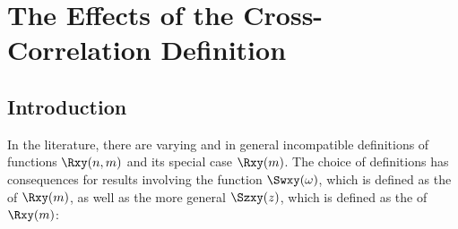 \chapter{The Effects of the Cross-Correlation Definition}
\label{app:xcordef}
\section{Introduction}
In the literature, there are varying and in general incompatible definitions of
 functions $\Rxy(n,m)$ and its  special case $\Rxy(m)$. %
The choice of definitions has consequences for results involving the  function
$\Swxy(\omega)$, %
which is defined as the  of $\Rxy(m)$,
as well as the more general $\Szxy(z)$,
which is defined as the  of $\Rxy(m)$:
\begin{definition}\label{def:Swxy}\label{def:Szxy}
\end{definition}

